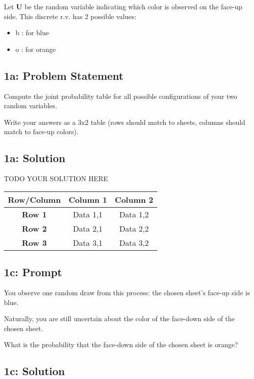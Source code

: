 \documentclass[10pt]{article}
\newcommand{\officialdirections}[1]{{\color{purple} #1}}
\begin{document}
Let $\boldsymbol{U}$
 be the random variable indicating which color is observed on the face-up side. This discrete r.v. has 2 possible values:
\begin{itemize}
    \item b : for blue
    \item o : for orange
\end{itemize}


\officialdirections{
\subsection*{1a: Problem Statement}
Compute the joint probability table for all possible configurations of your two random variables.

Write your answers as a 3x2 table (rows should match to sheets, columns should match to face-up colors).
}

\subsection{1a: Solution}

TODO YOUR SOLUTION HERE
\begin{center}
    \begin{tabular}{|c|c|c|}
        \hline
        \textbf{Row/Column} & \textbf{Column 1} & \textbf{Column 2} \\
        \hline
        \textbf{Row 1} & Data 1,1 & Data 1,2 \\
        \hline
        \textbf{Row 2} & Data 2,1 & Data 2,2 \\
        \hline
        \textbf{Row 3} & Data 3,1 & Data 3,2 \\
        \hline
    \end{tabular}
\end{center}

\officialdirections{
\subsection*{1c: Prompt}
You observe one random draw from this process: the chosen sheet's face-up side is blue.

Naturally, you are still uncertain about the color of the face-down side of the chosen sheet.

What is the probability that the face-down side of the chosen sheet is orange?
}
\subsection{1c: Solution}
\end{document}
